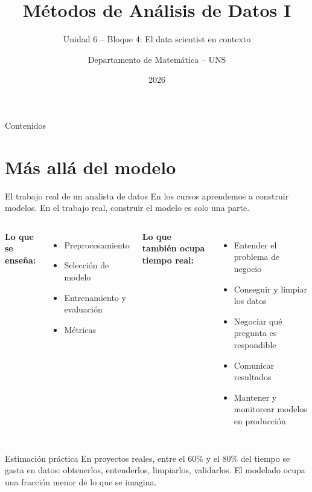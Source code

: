 \documentclass[aspectratio=169]{beamer}
\title[MAD1 -- U6]{Métodos de Análisis de Datos I}
\subtitle{Unidad 6 -- Bloque 4: El data scientist en contexto}
\author{Departamento de Matemática -- UNS}
\date{2026}
\begin{document}
\begin{frame}
  \titlepage
\end{frame}

\begin{frame}{Contenidos}
  \tableofcontents
\end{frame}

\section{Más allá del modelo}

\begin{frame}{El trabajo real de un analista de datos}
  En los cursos aprendemos a construir modelos. En el trabajo real, construir el modelo es solo una parte.

  \bigskip
  \begin{columns}
      \textbf{Lo que se enseña:}
      \begin{itemize}
        \item Preprocesamiento
        \item Selección de modelo
        \item Entrenamiento y evaluación
        \item Métricas
      \end{itemize}
      \textbf{Lo que también ocupa tiempo real:}
      \begin{itemize}
        \item Entender el problema de negocio
        \item Conseguir y limpiar los datos
        \item Negociar qué pregunta es respondible
        \item Comunicar resultados
        \item Mantener y monitorear modelos en producción
      \end{itemize}
  \end{columns}

  \bigskip
  \begin{alertblock}{Estimación práctica}
    En proyectos reales, entre el 60\% y el 80\% del tiempo se gasta en datos: obtenerlos, entenderlos, limpiarlos, validarlos. El modelado ocupa una fracción menor de lo que se imagina.
  \end{alertblock}
\end{frame}
\end{document}

